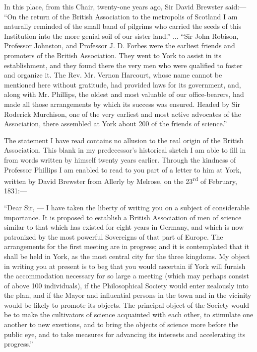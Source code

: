 \documentclass[a4paper, 11pt, oneside, english]{article}
\begin{document}
In this place, from this Chair, twenty-one years ago, Sir David Brewster said:--- ``On the return of the British Association to the metropolis of Scotland I am naturally reminded of the small band of pilgrims who carried the seeds of this Institution into the more genial soil of our sister land.'' ... ``Sir John Robison, Professor Johnston, and Professor J. D. Forbes were the earliest friends and promoters of the British Association. They went to York to assist in its establishment, and they found there the very men who were qualified to foster and organize it. The Rev. Mr. Vernon Harcourt, whose name cannot be mentioned here without gratitude, had provided laws for its government, and, along with Mr. Phillips, the oldest and most valuable of our office-bearers, had made all those arrangements by which its success was ensured. Headed by Sir Roderick Murchison, one of the very earliest and most active advocates of the Association, there assembled at York about 200 of the friends of science.''

The statement I have read contains no allusion to the real origin of the British Association. This blank in my predecessor's historical sketch I am able to fill in from words written by himself twenty years earlier. Through the kindness of Professor Phillips I am enabled to read to you part of a letter to him at York, written by David Brewster from Allerly by Melrose, on the 23\textsuperscript{rd} of February, 1831:---

``Dear Sir, --- I have taken the liberty of writing you on a subject of considerable importance. It is proposed to establish a British Association of men of science similar to that which has existed for eight years in Germany, and which is now patronized by the most powerful Sovereigns of that part of Europe. The arrangements for the first meeting are in progress; and it is contemplated that it shall be held in York, as the most central city for the three kingdoms. My object in writing you at present is to beg that you would ascertain if York will furnish the accommodation necessary for so large a meeting (which may perhaps consist of above 100 individuals), if the Philosophical Society would enter zealously into the plan, and if the Mayor and influential persons in the town and in the vicinity would be likely to promote its objects. The principal object of the Society would be to make the cultivators of science acquainted with each other, to stimulate one another to new exertions, and to bring the objects of science more before the public eye, and to take measures for advancing its interests and accelerating its progress.''
\end{document}
